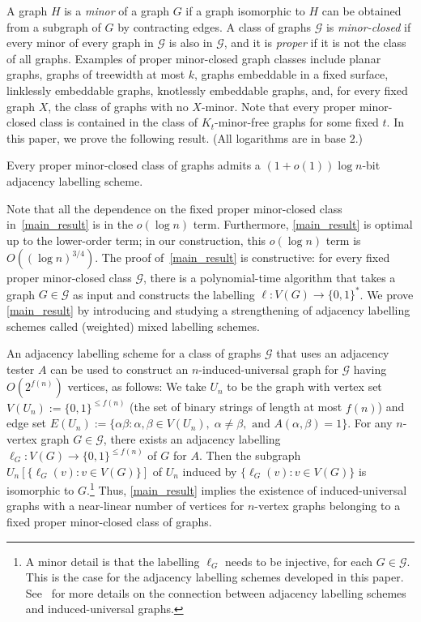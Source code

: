 \documentclass{patmorin}
\renewcommand{\le}{\leqslant}
\newcommand{\defin}[1]{\emph{\textcolor{brightmaroon}{#1}}}
\newcommand{\Oh}{O}
\newcommand{\calG}{\mathcal{G}}
\begin{document}
A graph $H$ is a \defin{minor} of a graph $G$ if a graph isomorphic to $H$ can
be obtained from a subgraph of $G$ by contracting edges. A class of graphs
$\calG$ is \defin{minor-closed} if every minor of every graph in
$\calG$ is also in $\calG$, and it is \defin{proper} if it is not the class of all graphs. Examples of proper minor-closed graph classes include planar graphs, graphs of treewidth at most $k$, graphs embeddable in a fixed
surface, linklessly embeddable graphs, knotlessly embeddable graphs, and, for every fixed graph $X$, the class of graphs with no $X$-minor. Note that every proper minor-closed class is contained in the class of $K_t$-minor-free graphs for some fixed $t$.  In this paper, we prove the following result. (All logarithms are in base $2$.)

\begin{thm}
  \label{main_result}
  Every proper minor-closed class of graphs admits
  a $(1+o(1))\log n$-bit adjacency labelling scheme.
\end{thm}

Note that all the dependence on the fixed proper minor-closed class in~\cref{main_result} is in the $o(\log n)$ term. Furthermore, \cref{main_result} is optimal up to the lower-order term; in our construction, this $o(\log n)$ term is $\Oh\left((\log n)^{3/4}\right)$. The proof of~\cref{main_result} is constructive: for every fixed proper minor-closed class $\calG$, there is a polynomial-time algorithm that takes a graph $G\in\calG$ as input and constructs the labelling $\ell:V(G)\to\{0,1\}^*$. We prove \cref{main_result} by introducing and studying a strengthening of adjacency labelling schemes called (weighted) mixed labelling schemes.

An adjacency labelling scheme for a class of graphs $\calG$ that uses an adjacency tester $A$ can be used to construct an $n$-induced-universal graph for $\calG$ having $\Oh(2^{f(n)})$ vertices, as follows:  We take $U_n$ to be the graph with vertex set $V(U_n):=\{0,1\}^{\le f(n)}$ (the set of binary strings of length at most $f(n)$) and edge set $E(U_n):=\{\alpha\beta: \alpha, \beta \in V(U_n),\; \alpha\neq\beta, \text{ and } A(\alpha,\beta)=1\}$.  For any $n$-vertex graph $G\in\calG$, there exists an adjacency labelling $\ell_G:V(G)\to\{0,1\}^{\le f(n)}$ of $G$ for $A$.  Then the subgraph $U_n[\{\ell_G(v):v\in V(G)\}]$ of $U_n$ induced by $\{\ell_G(v):v\in V(G)\}$ is isomorphic to $G$.\footnote{A minor detail is that the labelling $\ell_G$ needs to be injective, for each $G\in\calG$.  This is the case for the adjacency labelling schemes developed in this paper. See~\cite[Section~2.1]{spinrad:efficient} for more details on the connection between adjacency labelling schemes and induced-universal graphs.} Thus, \cref{main_result} implies the existence of induced-universal graphs with a near-linear number of vertices for $n$-vertex graphs belonging to a fixed proper minor-closed class of graphs.
\end{document}
